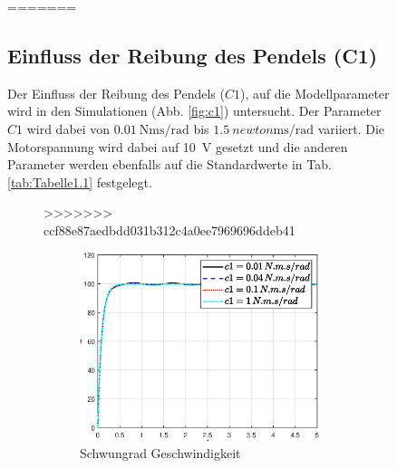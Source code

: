 \begin{figure}
=======
\subsection*{Einfluss der Reibung des Pendels (C1)}
Der Einfluss der Reibung des Pendels ($C1$), auf die Modellparameter wird in den Simulationen (Abb. \ref{fig:c1}) untersucht. 
Der Parameter $C1$ wird dabei von $\SI{0.01}{\newton\meter\second\per\radian}$ bis $\SI{1.5}{newton\meter\second\per\radian}$ variiert.
Die Motorspannung wird dabei auf \SI{10}{\volt} gesetzt und die anderen Parameter werden ebenfalls auf die Standardwerte in Tab. \ref{tab:Tabelle1.1} festgelegt.\\

 \begin{figure}
>>>>>>> ccf88e87aedbdd031b312c4a0ee7969696ddeb41
    \captionsetup[subfigure]{justification=centering,font=footnotesize}
    \begin{subfigure}[b]{0.49\linewidth}
        \includegraphics[width=\linewidth]{Bilder/5_sensi/fig/c1/phi_punkt.eps}
        \caption{Schwungrad Geschwindigkeit}
        \label{fig:c1_phi_punkt}
    \end{subfigure}
    \begin{subfigure}[b]{0.49 \linewidth}

\end{subfigure}
\end{figure}
\end{figure}
